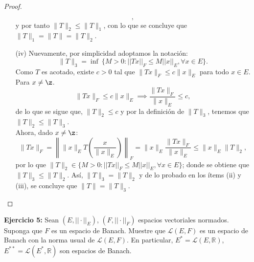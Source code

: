 \begin{proof}
\begin{enumerate}
\[    ,\]
    y por tanto $\|T\|_2\leq\|T\|_1$, con lo que se concluye que $\|T\|_1=\|T\|=\|T\|_2$.
    \item[(iv)] Nuevamente, por simplicidad adoptamos la notación:
    \[\|T\|_3=\inf\ \{M > 0: ||Tx||_F \leq M ||x||_E, \forall x\in E\}.\]
    Como $T$ es acotado, existe $c>0$ tal que $\|Tx\|_F\leq c\|x\|_E$ para todo $x\in E$. Para $x\neq \z$.
    \[
    \|Tx\|_F\leq c\|x\|_E \implies \frac{\|Tx\|_F}{\|x\|_E}\leq c,
    \]
    de lo que se sigue que, $\|T\|_2\leq c$ y por la definición de $\|T\|_3$, tenemos que\\
    $\|T\|_2\leq \|T\|_3$. \\
    Ahora, dado $x\neq \z$:
    \[
    \|Tx\|_F=\left\|\|x\|_ET\left(\frac{x}{\|x\|_E}\right)\right\|_F=\|x\|_E\frac{\|Tx\|_F}{\|x\|_E}\leq \|x\|_E\|T\|_2,
    \]
    por lo que $\|T\|_2 \in \{M > 0: ||Tx||_F \leq M ||x||_E, \forall x\in E\}$; donde se obtiene que $\|T\|_3\leq \|T\|_2$. Así,  $\|T\|_3= \|T\|_2$ y de lo probado en los ítems (ii) y (iii), se concluye que $\|T\|=\|T\|_3$.
\end{enumerate}
\end{proof}

\textbf{Ejercicio 5:} Sean $(E, ||\cdot ||_E)$, $(F, ||\cdot ||_F)$ espacios vectoriales normados. Suponga que $F$ es un espacio de Banach. Muestre que $\mathcal{L}(E,F)$ es un espacio de Banach con la norma usual de $\mathcal{L}(E,F)$. En particular, $E^*=\mathcal{L}(E,\mathbb{R})$, $E^{**}=\mathcal{L}(E^*,\mathbb{R})$ son espacios de Banach.\\

